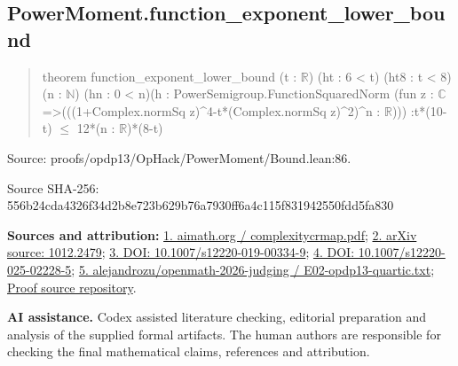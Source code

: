\documentclass[11pt,a4paper]{article}
\begin{document}
\begin{samepage}
\subsection{PowerMoment.function\_exponent\_lower\_bound}
\begin{quote}\small\ttfamily theorem function\_exponent\_lower\_bound (t : \ensuremath{\mathbb{R}}) (ht : 6 < t) (ht8 : t < 8)\newline     (n : \ensuremath{\mathbb{N}}) (hn : 0 < n)\newline     (h : PowerSemigroup.FunctionSquaredNorm (fun z : \ensuremath{\mathbb{C}} =>\newline       (((1+Complex.normSq z)\textasciicircum{}4-t*(Complex.normSq z)\textasciicircum{}2)\textasciicircum{}n : \ensuremath{\mathbb{R}}))) :\newline     t*(10-t) \ensuremath{\leq} 12*(n : \ensuremath{\mathbb{R}})*(8-t)\end{quote}
{\small Source: proofs/opdp13/OpHack/PowerMoment/Bound.lean:86.\par}

{\small Source SHA-256: 556b24cda4326f34d2b8e723b629b76a7930ff6a4c115f831942550fdd5fa830\par}

{\small\textbf{Sources and attribution:} \href{https://aimath.org/WWN/complexitycrmap/complexitycrmap.pdf}{1. aimath.org / complexitycrmap.pdf}; \href{https://arxiv.org/abs/1012.2479}{2. arXiv source: 1012.2479}; \href{https://doi.org/10.1007/s12220-019-00334-9}{3. DOI: 10.1007/s12220-019-00334-9}; \href{https://doi.org/10.1007/s12220-025-02228-5}{4. DOI: 10.1007/s12220-025-02228-5}; \href{https://github.com/alejandrozu/openmath-2026-judging/blob/d0ed487f487fa7ec814ff705ab55249983fe8707/OpenMath-Judging/review/entries/E02-opdp13-quartic.txt}{5. alejandrozu/openmath-2026-judging / E02-opdp13-quartic.txt}; \href{https://github.com/alejandrozu/openmath-2026-judging}{Proof source repository}.\par}

\end{samepage}
{\small \textbf{AI assistance.} Codex assisted literature checking, editorial preparation and analysis of the supplied formal artifacts. The human authors are responsible for checking the final mathematical claims, references and attribution.\par}
\end{document}
